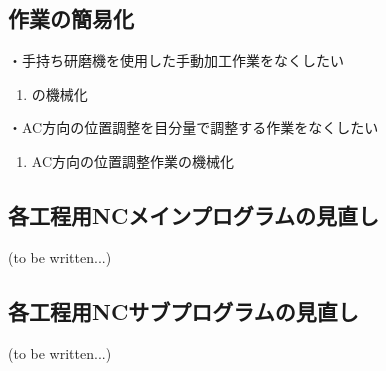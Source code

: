 \subsection{\EndFaceChamferMilling 作業の簡易化}
・手持ち研磨機を使用した手動加工作業をなくしたい
\begin{enumerate}[label=\sarrow]
\item \EndFaceChamferMilling の機械化
\end{enumerate}
・AC方向の位置調整を目分量で調整する作業をなくしたい
\begin{enumerate}[label=\sarrow]
\item AC方向の位置調整作業の機械化
\end{enumerate}



\clearpage


\subsection{各工程用NCメインプログラムの見直し\TBW}
(to be written...)


\subsection{各工程用NCサブプログラムの見直し\TBW}
(to be written...)



